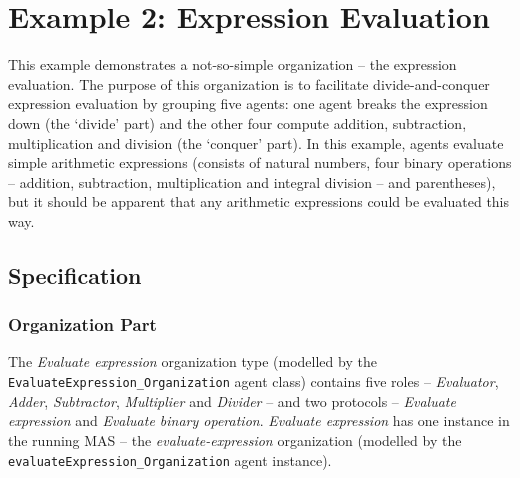 
\section{Example 2: Expression Evaluation}

This example demonstrates a not-so-simple organization -- the expression evaluation.
The purpose of this organization is to facilitate divide-and-conquer expression evaluation by grouping five agents: one agent breaks the expression down (the `divide' part) and the other four compute addition, subtraction, multiplication and division (the `conquer' part).
In this example, agents evaluate simple arithmetic expressions (consists of natural numbers, four binary operations -- addition, subtraction, multiplication and integral division -- and parentheses), but it should be apparent that any arithmetic expressions could be evaluated this way.

\subsection*{Specification}

\subsubsection*{Organization Part}

The \textit{Evaluate expression} organization type (modelled by the \texttt{EvaluateExpression\_Organization} agent class) contains five roles -- \textit{Evaluator}, \textit{Adder}, \textit{Subtractor}, \textit{Multiplier} and \textit{Divider} -- and two protocols -- \textit{Evaluate expression} and \textit{Evaluate binary operation}.
\textit{Evaluate expression} has one instance in the running MAS -- the \textit{evaluate-expression} organization (modelled by the \texttt{evaluateExpression\_Organization} agent instance).

